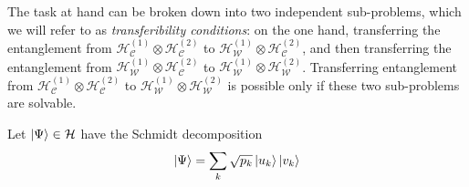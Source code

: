 \documentclass[
	aps, pra,
	superscriptaddress, twocolumn,
	floatfix,
	10pt
]{revtex4-1}
\newcommand{\parTitle}[1]{\noindent{\color{Mahogany}(\emph{#1})}}
\newcommand{\calC}{{\mathcal{C}}}
\newcommand{\calH}{{\mathcal{H}}}
\newcommand{\calW}{{\mathcal{W}}}
\renewcommand{\parTitle}[1]{}
\begin{document}
\parTitle{We are actually dealing with two problems at once}
The task at hand can be broken down into two independent sub-problems, which we will refer to as \textit{transferibility conditions}: on the one hand, transferring the entanglement from $\calH^{(1)}_{\calC}\otimes \calH^{(2)}_{\calC}$ to $\calH^{(1)}_{\calW}\otimes \calH^{(2)}_{\calC}$,
and then transferring the entanglement from
$\calH^{(1)}_{\calW}\otimes \calH^{(2)}_{\calC}$
to $\calH^{(1)}_{\calW}\otimes \calH^{(2)}_{\calW}$.
Transferring entanglement from $\calH^{(1)}_{\calC}\otimes\calH^{(2)}_{\calC}$ to
$\calH^{(1)}_{\calW}\otimes\calH^{(2)}_{\calW}$ is possible only if these two sub-problems are solvable.

\parTitle{Conditions for entanglement transfer}
Let $\ket\Psi\in\calH$ have the Schmidt decomposition
\begin{equation}
	\ket\Psi= \sum_k \sqrt{p_k} \ket{u_k}\ket{v_k} 
\end{equation}
\end{document}
